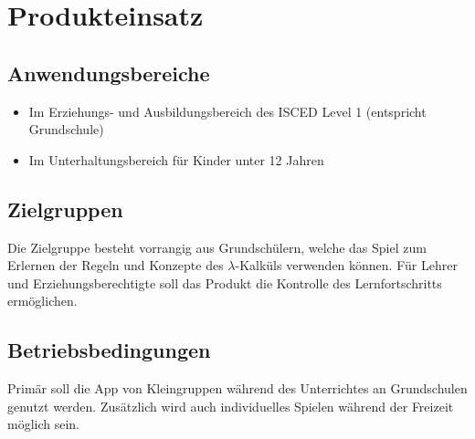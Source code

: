 \section{Produkteinsatz}

\subsection{Anwendungsbereiche}
\begin{itemize}
	\item Im Erziehungs- und Ausbildungsbereich des ISCED Level 1 (entspricht Grundschule)
	\item Im Unterhaltungsbereich für Kinder unter 12 Jahren
\end{itemize}


\subsection{Zielgruppen}
Die Zielgruppe besteht vorrangig aus Grundschülern, welche das Spiel zum Erlernen der Regeln und Konzepte des  \(\lambda\)-Kalküls verwenden können. Für Lehrer und Erziehungsberechtigte soll das Produkt die Kontrolle des Lernfortschritts ermöglichen.

\subsection{Betriebsbedingungen}
Primär soll die App von Kleingruppen während des Unterrichtes an Grundschulen genutzt werden. Zusätzlich wird auch individuelles Spielen während der Freizeit möglich sein.

